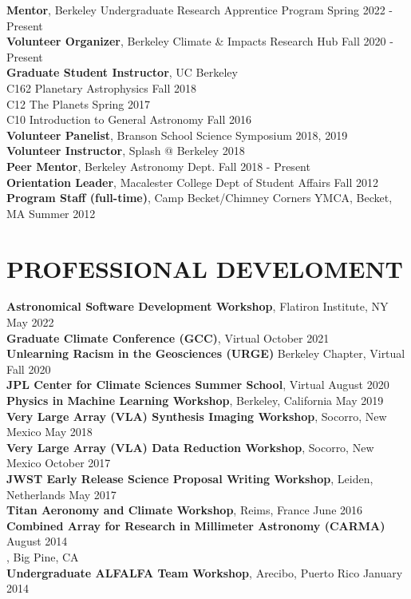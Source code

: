 \documentclass[margin, 10pt]{res} %
\newcommand\tab[1][1cm]{\hspace*{#1}}
\begin{document}
\begin{resume}
{\bf Mentor}, Berkeley Undergraduate Research Apprentice Program \hfill Spring 2022 - Present \\
{\bf Volunteer Organizer}, Berkeley Climate \& Impacts Research Hub \hfill Fall 2020 - Present \\
{\bf Graduate Student Instructor}, UC Berkeley \\
\tab C162 Planetary Astrophysics \hfill Fall 2018 \\
\tab C12 The Planets \hfill  Spring 2017 \\
\tab C10 Introduction to General Astronomy \hfill Fall 2016 \\
{\bf Volunteer Panelist}, Branson School Science Symposium \hfill 2018, 2019 \\
{\bf Volunteer Instructor}, Splash @ Berkeley \hfill 2018 \\
{\bf Peer Mentor}, Berkeley Astronomy Dept.
\hfill Fall 2018 - Present \\
{\bf Orientation Leader}, Macalester College Dept of Student Affairs
\hfill Fall 2012 \\
{\bf Program Staff (full-time)}, Camp Becket/Chimney Corners YMCA,
Becket, MA
\hfill Summer 2012



\section{PROFESSIONAL DEVELOMENT}

{\bf Astronomical Software Development Workshop}, Flatiron Institute, NY \hfill May 2022 \\ 
{\bf Graduate Climate Conference (GCC)}, Virtual \hfill October 2021 \\ 
{\bf Unlearning Racism in the Geosciences (URGE)} Berkeley Chapter, Virtual \hfill Fall 2020 \\ 
{\bf JPL Center for Climate Sciences Summer School}, Virtual \hfill August 2020 \\ 
{\bf Physics in Machine Learning Workshop}, Berkeley, California \hfill May 2019 \\
{\bf Very Large Array (VLA) Synthesis Imaging Workshop}, Socorro, New Mexico \hfill May 2018 \\
{\bf Very Large Array (VLA) Data Reduction Workshop}, Socorro, New Mexico \hfill October 2017 \\
{\bf JWST Early Release Science Proposal Writing Workshop}, Leiden, Netherlands \hfill May 2017 \\
{\bf Titan Aeronomy and Climate Workshop}, Reims, France \hfill June 2016 \\
{\bf Combined Array for Research in Millimeter Astronomy (CARMA)} \hfill August 2014 \\
  \tab {\bf Summer School}, Big Pine, CA  \\
{\bf Undergraduate ALFALFA Team Workshop}, Arecibo, Puerto Rico \hfill January 2014



\end{resume}
\end{document}

